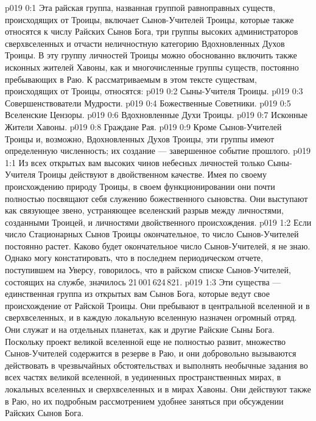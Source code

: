 \author{Божественный Советник}
\vs p019 0:1 Эта райская группа, названная группой равноправных существ, происходящих от Троицы, включает Сынов\hyp{}Учителей Троицы, которые также относятся к числу Райских Сынов Бога, три группы высоких администраторов сверхвселенных и отчасти неличностную категорию Вдохновленных Духов Троицы. В эту группу личностей Троицы можно обоснованно включить также исконных жителей Хавоны, как и многочисленные группы существ, постоянно пребывающих в Раю. К рассматриваемым в этом тексте существам, происходящих от Троицы, относятся:
\vs p019 0:2 \bibnobreakspace Сыны\hyp{}Учителя Троицы.
\vs p019 0:3 \bibnobreakspace Совершенствователи Мудрости.
\vs p019 0:4 \bibnobreakspace Божественные Советники.
\vs p019 0:5 \bibnobreakspace Вселенские Цензоры.
\vs p019 0:6 \bibnobreakspace Вдохновленные Духи Троицы.
\vs p019 0:7 \bibnobreakspace Исконные Жители Хавоны.
\vs p019 0:8 \bibnobreakspace Граждане Рая.
\vs p019 0:9 \pc Кроме Сынов\hyp{}Учителей Троицы и, возможно, Вдохновленных Духов Троицы, эти группы имеют определенную численность; их создание --- завершенное событие прошлого.
\vs p019 1:1 Из всех открытых вам высоких чинов небесных личностей только Сыны\hyp{}Учителя Троицы действуют в двойственном качестве. Имея по своему происхождению природу Троицы, в своем функционировании они почти полностью посвящают себя служению божественного сыновства. Они выступают как связующее звено, устраняющее вселенский разрыв между личностями, созданными Троицей, и личностями двойственного происхождения.
\vs p019 1:2 Если число Стационарных Сынов Троицы окончательное, то число Сынов\hyp{}Учителей постоянно растет. Каково будет окончательное число Сынов\hyp{}Учителей, я не знаю. Однако могу констатировать, что в последнем периодическом отчете, поступившем на Уверсу, говорилось, что в райском списке Сынов\hyp{}Учителей, состоящих на службе, значилось 21\,001\,624\,821.
\vs p019 1:3 Эти существа --- единственная группа из открытых вам Сынов Бога, которые ведут свое происхождение от Райской Троицы. Они пребывают в центральной вселенной и в сверхвселенных, и в каждую локальную вселенную назначен огромный отряд. Они служат и на отдельных планетах, как и другие Райские Сыны Бога. Поскольку проект великой вселенной еще не полностью развит, множество Сынов\hyp{}Учителей содержится в резерве в Раю, и они добровольно вызываются действовать в чрезвычайных обстоятельствах и выполнять необычные задания во всех частях великой вселенной, в уединенных пространственных мирах, в локальных вселенных и сверхвселенных и в мирах Хавоны. Они действуют также в Раю, но их подробным рассмотрением удобнее заняться при обсуждении Райских Сынов Бога.
